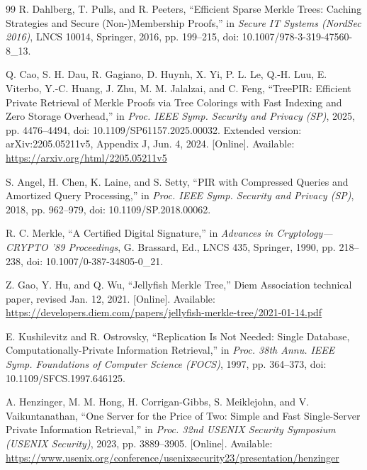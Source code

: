 \begin{thebibliography}{99}
R. Dahlberg, T. Pulls, and R. Peeters,
\newblock ``Efficient Sparse Merkle Trees: Caching Strategies and Secure (Non-)Membership Proofs,''
\newblock in \emph{Secure IT Systems (NordSec 2016)}, LNCS 10014, Springer, 2016, pp. 199--215, doi: 10.1007/978-3-319-47560-8\_13.

Q. Cao, S. H. Dau, R. Gagiano, D. Huynh, X. Yi, P. L. Le, Q.-H. Luu, E. Viterbo, Y.-C. Huang, J. Zhu, M. M. Jalalzai, and C. Feng,
\newblock ``TreePIR: Efficient Private Retrieval of Merkle Proofs via Tree Colorings with Fast Indexing and Zero Storage Overhead,''
\newblock in \emph{Proc. IEEE Symp. Security and Privacy (SP)}, 2025, pp. 4476--4494, doi: 10.1109/SP61157.2025.00032. Extended version: arXiv:2205.05211v5, Appendix J, Jun. 4, 2024. [Online]. Available: \url{https://arxiv.org/html/2205.05211v5}

S. Angel, H. Chen, K. Laine, and S. Setty,
\newblock ``PIR with Compressed Queries and Amortized Query Processing,''
\newblock in \emph{Proc. IEEE Symp. Security and Privacy (SP)}, 2018, pp. 962--979, doi: 10.1109/SP.2018.00062.

R. C. Merkle,
\newblock ``A Certified Digital Signature,''
\newblock in \emph{Advances in Cryptology---CRYPTO '89 Proceedings}, G. Brassard, Ed., LNCS 435, Springer, 1990, pp. 218--238, doi: 10.1007/0-387-34805-0\_21.

Z. Gao, Y. Hu, and Q. Wu,
\newblock ``Jellyfish Merkle Tree,''
\newblock Diem Association technical paper, revised Jan. 12, 2021. [Online]. Available: \url{https://developers.diem.com/papers/jellyfish-merkle-tree/2021-01-14.pdf}

E. Kushilevitz and R. Ostrovsky,
\newblock ``Replication Is Not Needed: Single Database, Computationally-Private Information Retrieval,''
\newblock in \emph{Proc. 38th Annu. IEEE Symp. Foundations of Computer Science (FOCS)}, 1997, pp. 364--373, doi: 10.1109/SFCS.1997.646125.

A. Henzinger, M. M. Hong, H. Corrigan-Gibbs, S. Meiklejohn, and V. Vaikuntanathan,
\newblock ``One Server for the Price of Two: Simple and Fast Single-Server Private Information Retrieval,''
\newblock in \emph{Proc. 32nd USENIX Security Symposium (USENIX Security)}, 2023, pp. 3889--3905. [Online]. Available: \url{https://www.usenix.org/conference/usenixsecurity23/presentation/henzinger}


\end{thebibliography}
